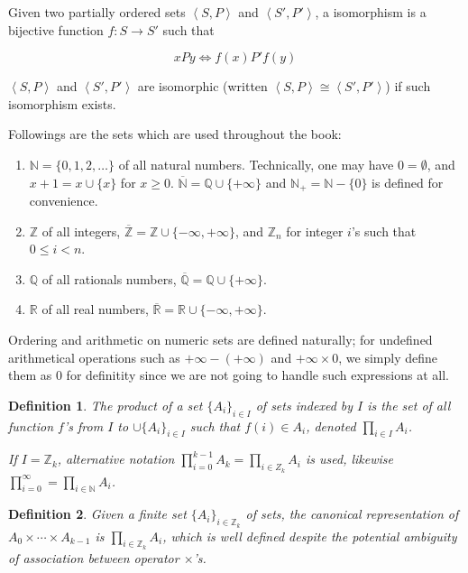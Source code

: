 \documentclass{book}
\newtheorem{definition}{Definition}
\theoremstyle{definition}\newtheorem{mechanism}{Mechanism}
\theoremstyle{remark}\newtheorem*{remark}{Remark}
\begin{document}
Given two partially ordered sets $\left<S, P\right>$ and $\left<S', P'\right>$, a isomorphism is a bijective function $f: S\to S'$ such that

\begin{equation*}
	xPy \iff f(x)P'f(y)
\end{equation*}

$\left<S, P\right>$ and $\left<S', P'\right>$ are isomorphic (written $\left<S, P\right> \cong \left<S', P'\right>$) if such isomorphism exists.

Followings are the sets which are used throughout the book:

\begin{enumerate}
	\item $\mathbb N = \{0, 1, 2, \dots\}$ of all natural numbers. Technically, one may have $0 = \emptyset$, and $x + 1 = x\cup\{x\}$ for $x\ge 0$. $\overline{\mathbb N} =\mathbb Q\cup\{+\infty\}$ and $\mathbb N_+ = \mathbb N - \{0\}$ is defined for convenience.
	\item $\mathbb Z$ of all integers, $\overline{\mathbb Z} =\mathbb Z\cup\{-\infty, +\infty\}$, and $\mathbb Z_n$ for integer $i$'s such that $0\le i< n$.
	\item $\mathbb Q$ of all rationals numbers, $\overline{\mathbb Q} =\mathbb Q\cup\{+\infty\}$.
	\item $\mathbb R$ of all real numbers, $\overline{\mathbb R} =\mathbb R\cup\{-\infty, +\infty\}$.
\end{enumerate}

Ordering and arithmetic on numeric sets are defined naturally; for undefined arithmetical operations such as $+\infty - (+\infty)$ and $+\infty\times 0$, we simply define them as 0 for definitity since we are not going to handle such expressions at all.

\begin{definition}
	The product of a set $\{A_i\}_{i\in I}$ of sets indexed by $I$ is the set of all function $f$'s from $I$ to $\cup\{A_i\}_{i\in I}$ such that $f(i)\in A_i$, denoted $\prod_{i\in I} A_i$.

	If $I = \mathbb Z_k$, alternative notation $\prod_{i=0}^{k - 1} A_k = \prod_{i\in Z_k} A_i$ is used, likewise $\prod_{i = 0}^{\infty} = \prod_{i\in\mathbb N} A_i$.
\end{definition}

\begin{definition}
	Given a finite set $\{A_i\}_{i\in \mathbb Z_k}$ of sets, the canonical representation of $A_0\times \cdots \times A_{k - 1}$ is $\prod_{i\in \mathbb Z_k} A_i$, which is well defined despite the potential ambiguity of association between operator $\times$'s.
\end{definition}
\end{document}
